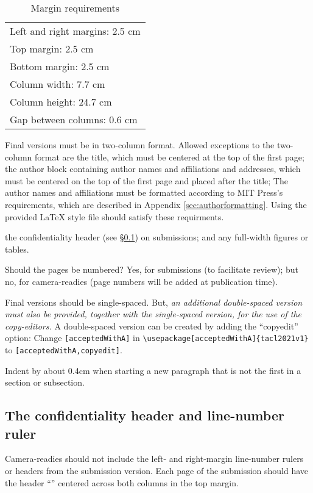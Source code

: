\documentclass[11pt,a4paper]{article}
\newcommand{\styleFileVersion}{tacl2021v1}
\newcommand{\Taclpaper}{Final version\xspace}
\newcommand{\Taclpapers}{Final versions\xspace}
\newcommand{\Taclpaper}{Submission\xspace}
\newcommand{\Taclpapers}{{\Taclpaper}s\xspace}
\begin{document}
\begin{table}[ht]
\begin{center}
\begin{tabular}{|l|}  \hline
Left and right margins: 2.5 cm \\
Top margin: 2.5 cm \\
Bottom margin: 2.5 cm \\
Column width: 7.7 cm \\
Column height: 24.7 cm \\
Gap between columns: 0.6 cm \\ \hline
\end{tabular}
\end{center}
\caption{\label{tab:margin-table} Margin requirements}
\end{table}


\Taclpapers must be in two-column format.
Allowed exceptions to the two-column format are the title, which must be
centered at the top of the first page;
\iftaclpubformat
the author block containing author names and affiliations and addresses, which
must be centered on the top of the first page and placed after the
title; The author names and affiliations must be formatted according
to MIT Press's requirements, which are described in Appendix
\ref{sec:authorformatting}. Using the provided LaTeX style file should
satisfy these requirments.

\else
the  confidentiality header (see \S\ref{sec:ruler-and-header}) on submissions;
\fi
and any full-width figures or tables.

Should the pages be numbered?  Yes, for submissions (to facilitate review); but
no, for camera-readies (page numbers will be added at publication time).

\Taclpapers should be single-spaced.
\iftaclpubformat
But, {\em an additional double-spaced version must also be provided, together with the
single-spaced version, for the use of the copy-editors.}  A double-spaced version can
be created by adding the ``copyedit'' option: Change \verb+[acceptedWithA]+ in
{\footnotesize {\tt {\textbackslash usepackage}[acceptedWithA]\{\styleFileVersion\}}}
to \verb+[acceptedWithA,copyedit]+.
\fi

{Indent} by about 0.4cm when starting a new paragraph that is not the first in a
section or subsection.

\subsection{The confidentiality header and line-number ruler}
\label{sec:ruler-and-header}
\iftaclpubformat
Camera-readies should not include the left- and right-margin line-number rulers
or headers from the submission version.
\else
Each page of the submission should have the header ``\confidentialtext''
centered across both columns in the top margin.
\end{document}
